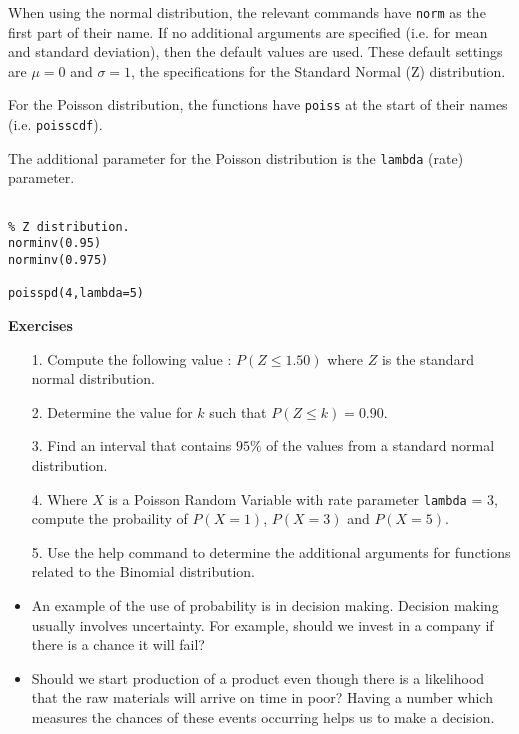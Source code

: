 \documentclass[]{report}
\begin{document}
{When using the normal distribution, the relevant commands have \texttt{norm} as the first part of their name.
If no additional arguments are specified (i.e. for mean and standard deviation), then the default values are
used. These default settings are $\mu=0$ and $\sigma=1$, the specifications for the Standard Normal (Z) distribution.

For the Poisson distribution, the functions have \texttt{poiss} at the start of their names (i.e. \texttt{poisscdf}).

The additional parameter for the Poisson distribution is the \texttt{lambda} (rate) parameter.

\begin{framed}
\begin{verbatim}

% Z distribution.
norminv(0.95)
norminv(0.975)

poisspd(4,lambda=5)
\end{verbatim}
\end{framed}

\textbf{Exercises}

\begin{itemize}
\item[1.] Compute the following value : $P(Z \leq 1.50)$ where $Z$ is the standard normal distribution.
\item[2.] Determine the value for $k$ such that $P(Z \leq k) = 0.90$.
\item[3.] Find an interval that contains $95\%$ of the values from a standard normal distribution.
\item[4.] Where $X$ is a Poisson Random Variable with rate parameter \texttt{lambda} = 3, compute the probaility of $P(X=1)$, $P(X=3)$ and $P(X=5)$.
\item[5.] Use the help command to determine the additional arguments for functions related to the Binomial distribution.
\end{itemize}



{ 




\begin{itemize}
\item An example of the use of probability is in decision making. Decision making usually involves uncertainty. For example, should we invest in a company if there is a chance it will fail? 

\item Should we start production of a product even though there is a likelihood that the raw materials will arrive on time in poor? Having a number which measures the chances of these events occurring helps us to make a decision.


\end{itemize}}}
\end{document}
